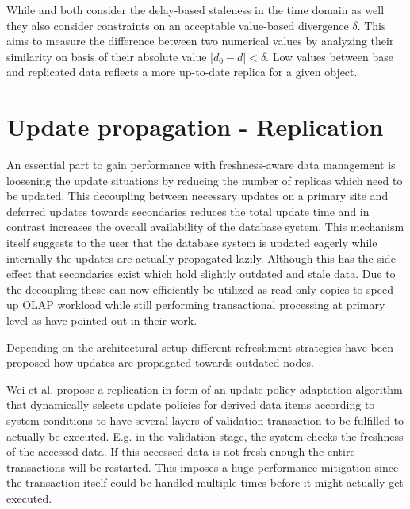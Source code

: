 While \cite{xiang:2008} and \cite{fekete:2018} both consider the delay-based staleness in the time domain as well they also consider constraints on 
an acceptable value-based divergence $\delta$. This aims to measure the difference between two numerical values by analyzing their similarity on basis of their 
absolute value $|d_0 - d| < \delta $. Low values between base and replicated data reflects a more up-to-date replica for a given object.




\section{Update propagation - Replication}
\label{r:replication}
An essential part to gain performance with freshness-aware data management is loosening the update situations by reducing the number of 
replicas which need to be updated. This decoupling between necessary updates on a primary site and deferred updates towards secondaries 
reduces the total update time and in contrast increases the overall availability of the database system.
This mechanism itself suggests to the user that the database system is updated eagerly while internally the updates are actually propagated lazily. 
Although this has the side effect that secondaries exist which hold slightly outdated and stale data. 
Due to the decoupling these can now efficiently be utilized as read-only copies to speed up OLAP workload while still performing transactional processing 
at primary level as \cite{psaroudakis:2015} \cite{rohm:2002} \cite{xiang:2008} have pointed out in their work.

Depending on the architectural setup different refreshment strategies have been proposed how updates are propagated towards outdated nodes.

Wei et al. \cite{wei:2004} propose a replication in form of an update policy adaptation algorithm that dynamically selects update policies
for derived data items according to system conditions to have several layers of validation transaction to be fulfilled to actually be executed.
E.g. in the validation stage, the system checks the freshness of the accessed data. If this accessed data is not fresh enough the entire transactions will be restarted.
This imposes a huge performance mitigation since the transaction itself could be handled multiple times before it might actually get executed.

